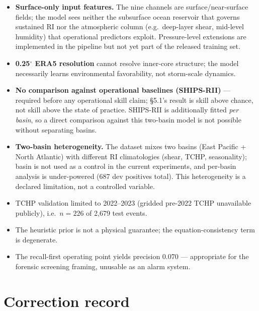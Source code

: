 \documentclass[11pt]{article}
\begin{document}
\begin{itemize}
  \item \textbf{Surface-only input features.} The nine channels are
        surface/near-surface fields; the model sees neither the subsurface
        ocean reservoir that governs sustained RI nor the atmospheric column
        (e.g.\ deep-layer shear, mid-level humidity) that operational
        predictors exploit. Pressure-level extensions are implemented in the
        pipeline but not yet part of the released training set.
  \item \textbf{0.25$^{\circ}$ ERA5 resolution} cannot resolve inner-core
        structure; the model necessarily learns environmental favorability,
        not storm-scale dynamics.
  \item \textbf{No comparison against operational baselines (SHIPS-RII)} ---
        required before any operational skill claim; \S5.1's result is skill
        above chance, not skill above the state of practice. SHIPS-RII is
        additionally fitted \emph{per basin}, so a direct comparison against
        this two-basin model is not possible without separating basins.
  \item \textbf{Two-basin heterogeneity.} The dataset mixes two basins (East
        Pacific + North Atlantic) with different RI climatologies (shear,
        TCHP, seasonality); basin is not used as a control in the current
        experiments, and per-basin analysis is under-powered (687 dev
        positives total). This heterogeneity is a declared limitation, not a
        controlled variable.
  \item TCHP validation limited to 2022--2023 (gridded pre-2022 TCHP
        unavailable publicly), i.e.\ $n = 226$ of 2{,}679 test events.
  \item The heuristic prior is not a physical guarantee; the
        equation-consistency term is degenerate.
  \item The recall-first operating point yields precision 0.070 ---
        appropriate for the forensic screening framing, unusable as an alarm
        system.
\end{itemize}

\section{Correction record}
\end{document}
